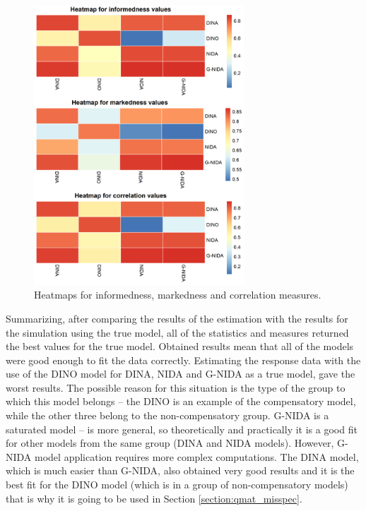 \documentclass[english]{pwr_wmat_praca_dyplomowa}
\theoremstyle{plain}
\numberwithin{theorem}{chapter}
\theoremstyle{definition}
\numberwithin{theorem}{chapter}
\begin{document}
	\begin{figure}[ht!]
		\centering
		\includegraphics[width=0.7\textwidth]{Heatmaps_absolute_fit.png}
		\caption{Heatmaps for informedness, markedness and correlation measures.}
		\label{heatmap_measures}
	\end{figure}
	
	Summarizing, after comparing the results of the estimation with the results for the simulation using the true model, all of the statistics and measures returned the best values for the true model. Obtained results mean that all of the models were good enough to fit the data correctly. Estimating the response data with the use of the DINO model for DINA, NIDA and G-NIDA as a true model, gave the worst results. The possible reason for this situation is the type of the group to which this model belongs -- the DINO is an example of the compensatory model, while the other three belong to the non-compensatory group. G-NIDA is a saturated model -- is more general, so theoretically and practically it is a good fit for other models from the same group (DINA and NIDA models). However, G-NIDA model application requires more complex computations. The DINA model, which is much easier than G-NIDA, also obtained very good results and it is the best fit for the DINO model (which is in a group of non-compensatory models) that is why it is going to be used in Section \ref{section:qmat_misspec}.
	
\end{document}
